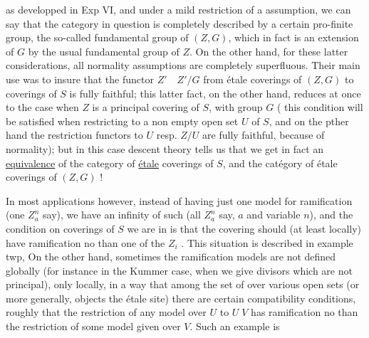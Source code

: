 as developped in Exp VI, and under a mild restriction  of a  assumption, we can say that the category in question is  completely described by a certain pro-finite group, the so-called fundamental group of $(Z,G)$, which in fact is an extension of $G$ by the usual fundamental group of $Z$. On the other hand, for these latter considerations, all normality assumptions are completely superfluous. Their main use was to insure that the functor $Z'\quad Z'/G$ from étale coverings of $(Z,G)$ to coverings of $S$ is fully faithful; this latter fact, on the other hand, reduces at once to the case when $Z$ is a principal covering of $S$, with group $G$ ( this condition will be satisfied when restricting to a non empty open set $U$ of $S$, and on the pther hand the restriction functors  to $U$ resp. $Z/U$ are fully faithful, because of normality); but in this case descent theory tells us that we get in fact an \uline{equivalence} of the category of \uline{étale} coverings of $S$, and the catégory of étale coverings of $(Z,G)$ !

In most applications however, instead of having just one model for ramification (one $Z_a^n$ say), we have an infinity of such (all $Z_a^n$ say,  $a$ and variable $n$), and the condition on coverings  of $S$ we are  in is that the covering should (at least locally) have ramification no  than one of the $Z_i$ . This situation is described in example twp, On the other hand, sometimes the ramification models are not defined globally (for instance in the Kummer case, when we give  divisors which are not principal), only locally, in a way that among the set of   over various open sets (or more generally, objects  the étale site) there are certain compatibility conditions, roughly that the restriction of any model over $U$ to $U\;V$ has ramification no  than the restriction of some model given over $V$. Such an example is
